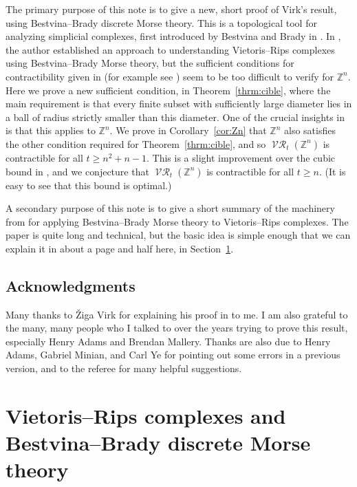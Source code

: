\documentclass[a4paper,11pt]{amsart}
\theoremstyle{definition}
\newcommand{\Z}{\mathbb{Z}}
\DeclareMathOperator{\Rips}{\mathcal{VR}}
\numberwithin{equation}{section}
\begin{document}
The primary purpose of this note is to give a new, short proof of Virk's result, using Bestvina--Brady discrete Morse theory. This is a topological tool for analyzing simplicial complexes, first introduced by Bestvina and Brady in \cite{bestvina97}. In \cite{zaremsky22}, the author established an approach to understanding Vietoris--Rips complexes using Bestvina--Brady Morse theory, but the sufficient conditions for contractibility given in \cite{zaremsky22} (for example see \cite[Theorem~3.5]{zaremsky22}) seem to be too difficult to verify for $\Z^n$. Here we prove a new sufficient condition, in Theorem~\ref{thrm:cible}, where the main requirement is that every finite subset with sufficiently large diameter lies in a ball of radius strictly smaller than this diameter. One of the crucial insights in \cite{virk25} is that this applies to $\Z^n$. We prove in Corollary~\ref{cor:Zn} that $\Z^n$ also satisfies the other condition required for Theorem~\ref{thrm:cible}, and so $\Rips_t(\Z^n)$ is contractible for all $t\ge n^2+n-1$. This is a slight improvement over the cubic bound in \cite{virk25}, and we conjecture that $\Rips_t(\Z^n)$ is contractible for all $t\ge n$. (It is easy to see that this bound is optimal.)

A secondary purpose of this note is to give a short summary of the machinery from \cite{zaremsky22} for applying Bestvina--Brady Morse theory to Vietoris--Rips complexes. The paper \cite{zaremsky22} is quite long and technical, but the basic idea is simple enough that we can explain it in about a page and half here, in Section~\ref{sec:background}.


\subsection*{Acknowledgments} Many thanks to \v Ziga Virk for explaining his proof in \cite{virk25} to me. I am also grateful to the many, many people who I talked to over the years trying to prove this result, especially Henry Adams and Brendan Mallery. Thanks are also due to Henry Adams, Gabriel Minian, and Carl Ye for pointing out some errors in a previous version, and to the referee for many helpful suggestions.




\section{Vietoris--Rips complexes and Bestvina--Brady discrete Morse theory}\label{sec:background}
\end{document}
